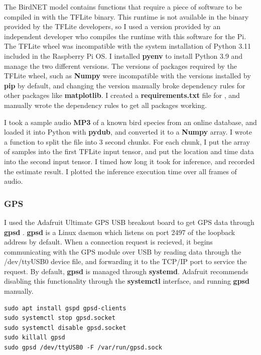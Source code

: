 \documentclass[12pt]{article}
\begin{document}
	The BirdNET model contains functions that require a piece of software to be compiled in with the TFLite binary. This runtime is not available in the binary provided by the TFLite developers, so I used a version provided by an independent developer who compiles the runtime with this software for the Pi. The TFLite wheel was incompatible with the system installation of Python 3.11 included in the Raspberry Pi OS. I installed \textbf{pyenv} to install Python 3.9 and manage the two different versions. The versions of packages required by the TFLite wheel, such as \textbf{Numpy} were incompatible with the versions installed by \textbf{pip} by default, and changing the version manually broke dependency rules for other packages like \textbf{matplotlib}. I created a \textbf{requirements.txt} file for , and manually wrote the dependency rules  to get all packages working.
	
	I took a sample audio \textbf{MP3} of a known bird species from an online database, and loaded it into Python with \textbf{pydub}, and converted it to a \textbf{Numpy} array. I wrote a function to split the file into 3 second chunks. For each chunk, I put the array of samples into the first TFLite input tensor, and put the location and time data into the second input tensor. I timed how long it took for inference, and recorded the estimate result. I plotted the inference execution time over all frames of audio.
	
\subsubsection{GPS}
	I used the Adafruit Ultimate GPS USB breakout board to get GPS data through \textbf{gpsd} \cite{townsend2023}. \textbf{gpsd} is a Linux daemon which listens on port 2497 of the loopback address by default. When a connection request is recieved, it begins communicating with the GPS module over USB by reading data through the /dev/ttyUSB0 device file, and forwarding it to the TCP/IP port to service the request. By default, \textbf{gpsd} is managed through \textbf{systemd}. Adafruit recommends disabling this functionality through the \textbf{systemctl} interface, and running \textbf{gpsd} manually.
	
\begin{lstlisting}
sudo apt install gspd gpsd-clients
sudo systemctl stop gpsd.socket
sudo systemctl disable gpsd.socket
sudo killall gpsd
sudo gpsd /dev/ttyUSB0 -F /var/run/gpsd.sock
\end{lstlisting}
\end{document}
